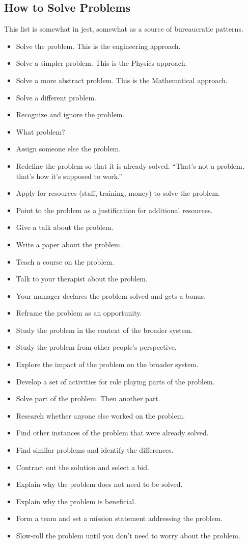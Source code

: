 \subsection{How to Solve Problems}

This list is somewhat in jest, somewhat as a source of bureaucratic patterns.

\begin{itemize}
    \item Solve the problem. This is the engineering approach.
    \item Solve a simpler problem. This is the Physics approach.
    \item Solve a more abstract problem. This is the Mathematical approach.
    \item Solve a different problem.
    \item Recognize and ignore the problem. 
    \item What problem?
    \item Assign someone else the problem.
    \item Redefine the problem so that it is already solved. ``That's not a problem, that's how it's supposed to work.''
    \item Apply for resources (staff, training, money) to solve the problem.
    \item Point to the problem as a justification for additional resources.
    \item Give a talk about the problem.
    \item Write a paper about the problem.
    \item Teach a course on the problem.
    \item Talk to your therapist about the problem.
    \item Your manager declares the problem solved and gets a bonus.
    \item Reframe the problem as an opportunity. 
    \item Study the problem in the context of the broader system.
    \item Study the problem from other people's perspective.
    \item Explore the impact of the problem on the broader system.
    \item Develop a set of activities for role playing parts of the problem. 
    \item Solve part of the problem. Then another part.
    \item Research whether anyone else worked on the problem.
    \item Find other instances of the problem that were already solved.
    \item Find similar problems and identify the differences.
    \item Contract out the solution and select a bid.
    \item Explain why the problem does not need to be solved.
    \item Explain why the problem is beneficial. 
    \item Form a team and set a mission statement addressing the problem.
    \item Slow-roll the problem until you don't need to worry about the problem. 
\end{itemize}